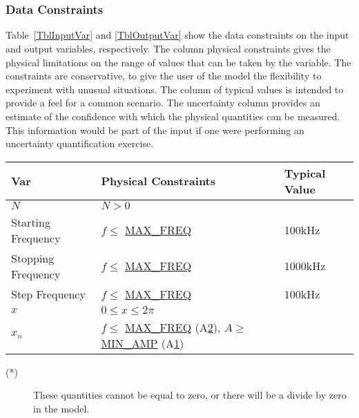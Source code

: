 \documentclass[12pt]{article}
\begin{document}
~\newline

~\newline
\subsubsection{Data Constraints} \label{sec_DataConstraints}    

Table~\ref{TblInputVar} and \ref{TblOutputVar} show the data constraints on the
input and output variables, respectively.  The column physical constraints gives
the physical limitations on the range of values that can be taken by the
variable.  The constraints are conservative, to give the user of the model the
flexibility to experiment with unusual situations.  The column of typical values
is intended to provide a feel for a common scenario.  The uncertainty column
provides an estimate of the confidence with which the physical quantities can be
measured.  This information would be part of the input if one were performing an
uncertainty quantification exercise.


\begin{table}[!h]
\caption{Input Variables} \label{TblInputVar}
\renewcommand{\arraystretch}{1.2}
\noindent \begin{longtable*}{l l l} 
  \toprule
  \textbf{Var} & \textbf{Physical Constraints} & \textbf{Typical Value}\\
  \midrule 
  $N$ & $N>0$ \\
  Starting Frequency & $f \leq$ \hyperref[AppendA]{MAX\_FREQ} & 100kHz\\
  Stopping Frequency  & $f \leq$ \hyperref[AppendA]{MAX\_FREQ} & 1000kHz\\
  Step Frequency & $f \leq$ \hyperref[AppendA]{MAX\_FREQ} & 100kHz\\
  $x$ & $0 \leq x \leq 2 \pi$ & \\
  $x_n$ & $f \leq$ \hyperref[AppendA]{MAX\_FREQ} (A\hyperref[A_MaxFreq]{2}), $A 
\geq$ 
\hyperref[AppendA]{MIN\_AMP} (A\hyperref[A_MinVolt]{1}) &\\  
  \bottomrule
\end{longtable*}
\end{table}

\noindent \begin{description}
\item[(*)] These quantities cannot be equal to zero, or there will be a divide
  by zero in the model.
\end{description}
\end{document}
